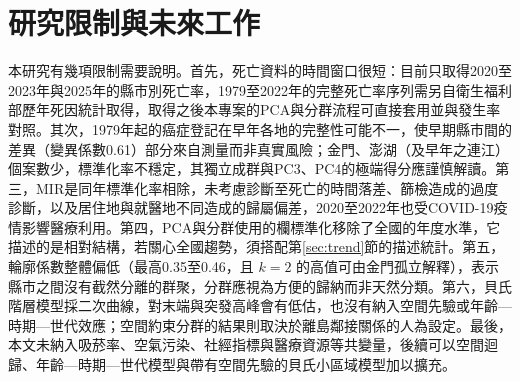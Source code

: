 \documentclass[UTF8,a4paper,11pt]{ctexart}
\begin{document}
\section{研究限制與未來工作}\label{sec:limit}
本研究有幾項限制需要說明。首先，死亡資料的時間窗口很短：目前只取得2020至2023年與2025年的縣市別死亡率，1979至2022年的完整死亡率序列需另自衛生福利部歷年死因統計取得，取得之後本專案的PCA與分群流程可直接套用並與發生率對照。其次，1979年起的癌症登記在早年各地的完整性可能不一，使早期縣市間的差異（變異係數0.61）部分來自測量而非真實風險；金門、澎湖（及早年之連江）個案數少，標準化率不穩定，其獨立成群與PC3、PC4的極端得分應謹慎解讀。第三，MIR是同年標準化率相除，未考慮診斷至死亡的時間落差、篩檢造成的過度診斷，以及居住地與就醫地不同造成的歸屬偏差，2020至2022年也受COVID-19疫情影響醫療利用。第四，PCA與分群使用的欄標準化移除了全國的年度水準，它描述的是相對結構，若關心全國趨勢，須搭配第\ref{sec:trend}節的描述統計。第五，輪廓係數整體偏低（最高0.35至0.46，且 $k=2$ 的高值可由金門孤立解釋），表示縣市之間沒有截然分離的群聚，分群應視為方便的歸納而非天然分類。第六，貝氏階層模型採二次曲線，對末端與突發高峰會有低估，也沒有納入空間先驗或年齡—時期—世代效應；空間約束分群的結果則取決於離島鄰接關係的人為設定。最後，本文未納入吸菸率、空氣污染、社經指標與醫療資源等共變量，後續可以空間迴歸、年齡—時期—世代模型與帶有空間先驗的貝氏小區域模型加以擴充。

\end{document}

